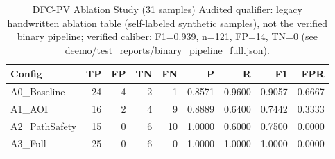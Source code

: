 \begin{table}[htbp]
\centering
\caption{DFC-PV Ablation Study (31 samples) Audited qualifier: legacy handwritten ablation table (self-labeled synthetic samples), not the verified binary pipeline; verified caliber: F1=0.939, n=121, FP=14, TN=0 (see deemo/test_reports/binary_pipeline_full.json).}
\label{tab:dfc_pv_ablation}
\begin{tabular}{lrrrrrrrr}
\toprule
Config & TP & FP & TN & FN & P & R & F1 & FPR \\
\midrule
  A0_Baseline & 24 & 4 & 2 & 1 & 0.8571 & 0.9600 & 0.9057 & 0.6667 \\
  A1_AOI & 16 & 2 & 4 & 9 & 0.8889 & 0.6400 & 0.7442 & 0.3333 \\
  A2_PathSafety & 15 & 0 & 6 & 10 & 1.0000 & 0.6000 & 0.7500 & 0.0000 \\ %
  A3_Full & 25 & 0 & 6 & 0 & 1.0000 & 1.0000 & 1.0000 & 0.0000 \\ %
\bottomrule
\end{tabular}
\end{table}
